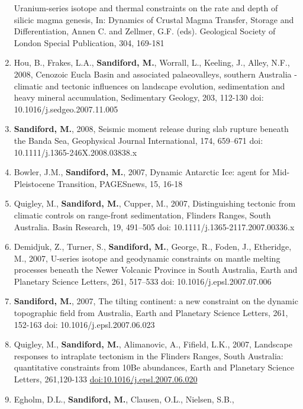 \documentclass[
]{article}
\begin{document}
\begin{enumerate}
  Uranium-series isotope and thermal constraints on the rate and depth
  of silicic magma genesis, In: Dynamics of Crustal Magma Transfer,
  Storage and Differentiation, Annen C. and Zellmer, G.F. (eds).
  Geological Society of London Special Publication, 304, 169-181
\item
  Hou, B., Frakes, L.A., \textbf{Sandiford, M.}, Worrall, L., Keeling,
  J., Alley, N.F., 2008, Cenozoic Eucla Basin and associated
  palaeovalleys, southern Australia - climatic and tectonic influences
  on landscape evolution, sedimentation and heavy mineral accumulation,
  Sedimentary Geology, 203, 112-130 doi: 10.1016/j.sedgeo.2007.11.005
\item
  \textbf{Sandiford, M.}, 2008, Seismic moment release during slab
  rupture beneath the Banda Sea, Geophysical Journal International, 174,
  659--671 doi: 10.1111/j.1365-246X.2008.03838.x
\item
  Bowler, J.M., \textbf{Sandiford, M.}, 2007, Dynamic Antarctic Ice:
  agent for Mid-Pleistocene Transition, PAGESnews, 15, 16-18
\item
  Quigley, M., \textbf{Sandiford, M.}, Cupper, M., 2007, Distinguishing
  tectonic from climatic controls on range-front sedimentation, Flinders
  Ranges, South Australia. Basin Research, 19, 491--505 doi:
  10.1111/j.1365-2117.2007.00336.x 
\item
  Demidjuk, Z., Turner, S., \textbf{Sandiford, M.}, George, R., Foden,
  J., Etheridge, M., 2007, U-series isotope and geodynamic constraints
  on mantle melting processes beneath the Newer Volcanic Province in
  South Australia, Earth and Planetary Science Letters, 261, 517--533
  doi: 10.1016/j.epsl.2007.07.006 
\item
  \textbf{Sandiford, M.}, 2007, The tilting continent: a new constraint
  on the dynamic topographic field from Australia, Earth and Planetary
  Science Letters, 261, 152-163 doi: 10.1016/j.epsl.2007.06.023
\item
  Quigley, M., \textbf{Sandiford, M.}, Alimanovic, A., Fifield, L.K.,
  2007, Landscape responses to intraplate tectonism in the Flinders
  Ranges, South Australia: quantitative constraints from 10Be
  abundances, Earth and Planetary Science Letters, 261,120-133
  \url{doi:10.1016/j.epsl.2007.06.020} 
\item
  Egholm, D.L., \textbf{Sandiford, M.}, Clausen, O.L., Nielsen, S.B.,

\end{enumerate}
\end{document}
